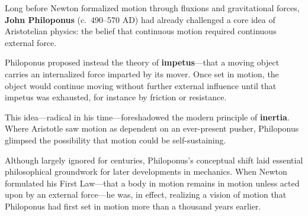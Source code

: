 \begin{tcolorbox}[colback=gray!5!white, colframe=black, title=\textbf{Historical Footnote: Philoponus and the Seeds of Inertia}, fonttitle=\bfseries, arc=1.5mm, boxrule=0.4pt]

  Long before Newton formalized motion through fluxions and gravitational forces, \textbf{John Philoponus} (c.~490--570 AD) had already challenged a core idea of Aristotelian physics: the belief that continuous motion required continuous external force.
  
  Philoponus proposed instead the theory of \textbf{impetus}---that a moving object carries an internalized force imparted by its mover. Once set in motion, the object would continue moving without further external influence until that impetus was exhausted, for instance by friction or resistance.
  
  \medskip
  
  This idea---radical in his time---foreshadowed the modern principle of \textbf{inertia}. Where Aristotle saw motion as dependent on an ever-present pusher, Philoponus glimpsed the possibility that motion could be self-sustaining.
  
  \medskip
  
  Although largely ignored for centuries, Philoponus's conceptual shift laid essential philosophical groundwork for later developments in mechanics. When Newton formulated his First Law---that a body in motion remains in motion unless acted upon by an external force---he was, in effect, realizing a vision of motion that Philoponus had first set in motion more than a thousand years earlier.
  
\end{tcolorbox}